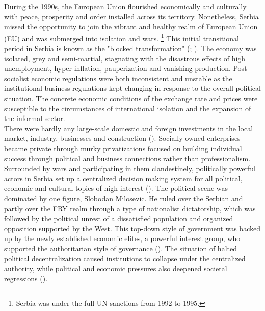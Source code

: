 \documentclass[11pt]{report}
\begin{document}
{{{{During the 1990s, the European Union flourished economically and culturally with peace, prosperity and order installed across its territory. Nonetheless, Serbia missed the opportunity to join the vibrant and healthy realm of European Union (EU) and was submerged into isolation and wars. 
\footnote{Serbia was under the full UN sanctions from 1992 to 1995.} 
This initial transitional period in Serbia is known as the "blocked transformation" (\href{Lazic}{\citealt{lazic_nation_2009}}; \href{Vujosevic}{\citealt{vujosevic_conundrum_2012}}).
The economy was isolated, grey and semi-martial, stagnating with the disastrous effects of high unemployment, hyper-inflation, pauperization and vanishing production.  Post-socialist economic regulations were both inconsistent and unstable as the institutional business regulations kept changing in response to the overall political situation. The concrete economic conditions of the exchange rate and prices were susceptible to the circumstances of international isolation and the expansion of the informal sector.
\\

There were hardly any large-scale domestic and foreign investments in the local market, industry, businesses and construction (\href{Vujosevic}{\citealt{vujosevic_planning_2006}}).
Socially owned enterprises became private through murky privatizations focused on building individual success through political and business connections rather than professionalism.
Surrounded by wars and participating in them clandestinely, politically powerful actors in Serbia set up a centralized decision making system for all political, economic and cultural topics of high interest (\href{Nedovic}{\citealt{nedovic-budic_mornings_2011}}).
The political scene was dominated by one figure, Slobodan Milosevic. He ruled over the Serbian and partly over the FRY realm through a type of nationalist dictatorship, which was followed by the political unrest of a dissatisfied population and organized opposition supported by the West. This top-down style of government was backed up by the newly established economic elites, a powerful interest group, who supported the authoritarian style of governance (\href{Vujovic}{\citealt{vujovic_belgrades_2007}}).
The situation of halted political decentralization caused institutions to collapse under the centralized authority, while political and economic pressures also deepened societal regressions (\href{Nedovic}{\citealt{nedovic-budic_mornings_2011}}). 
\\

}}}}
\end{document}
